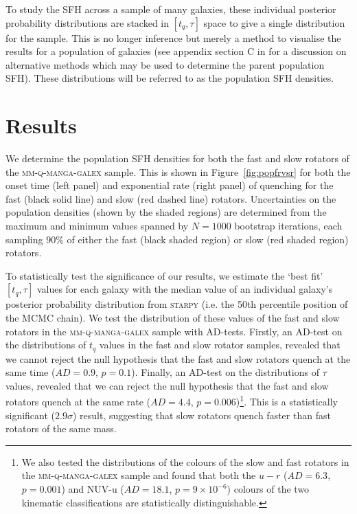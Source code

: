 \documentclass[useAMS,usenatbib]{mn2e}
\begin{document}
To study the SFH across a sample of many galaxies, these individual posterior probability distributions are stacked in $[t_q, \tau]$ space to give a single distribution for the sample. This is no longer inference but merely a method to visualise the results for a population of galaxies (see appendix section C in \citealt{smethurst16} for a discussion on alternative methods which may be used to determine the parent population SFH). These distributions will be referred to as the population SFH densities.

\section{Results}\label{sec:results}

We determine the population SFH densities for both the fast and slow rotators of the \textsc{mm-q-manga-galex} sample. This is shown in Figure~\ref{fig:popfrvsr} for both the onset time (left panel) and exponential rate (right panel) of quenching for the fast (black solid line) and slow (red dashed line) rotators. Uncertainties on the population densities (shown by the shaded regions) are determined from the maximum and minimum values spanned by $N = 1000$ bootstrap iterations, each sampling $90\%$ of either the fast (black shaded region) or slow (red shaded region) rotators. 

To statistically test the significance of our results, we estimate the `best fit' $[t_q, \tau]$ values for each galaxy with the median value of an individual galaxy's posterior probability distribution from \textsc{starpy} (i.e. the 50th percentile position of the MCMC chain). We test the distribution of these values of the fast and slow rotators in the \textsc{mm-q-manga-galex} sample with AD-tests. Firstly, an AD-test on the distributions of $t_q$ values in the fast and slow rotator samples, revealed that we cannot reject the null hypothesis that the fast and slow rotators quench at the same time ($AD= 0.9$, $p = 0.1$). Finally, an AD-test on the distributions of $\tau$ values, revealed that we can reject the null hypothesis that the fast and slow rotators quench at the same rate ($AD= 4.4$, $p = 0.006$)\footnote{We also tested the distributions of the colours of the slow and fast rotators in the \textsc{mm-q-manga-galex} sample and found that both the $u-r$ ($AD= 6.3$, $p = 0.001$) and NUV-u ($AD= 18.1$, $p = 9\times10^{-6}$) colours of the two kinematic classifications are statistically distinguishable.}. This is a statistically significant ($2.9\sigma$) result, suggesting that slow rotators quench faster than fast rotators of the same mass.
\end{document}
